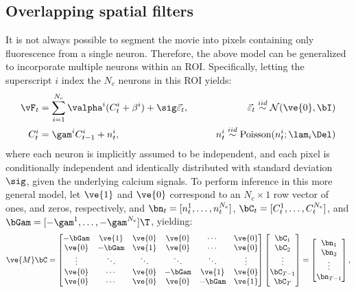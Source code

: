 \subsection{Overlapping spatial filters} \label{sec:methods:overlapping}

It is not always possible to segment the movie into pixels containing only fluorescence from a single neuron.  Therefore, the above model can be generalized to incorporate multiple neurons within an ROI.   Specifically, letting the superscript $i$ index the $N_c$ neurons in this ROI yields:  
\begin{align} \label{eq:overlapping}
\vF_t &= \sum_{i=1}^{N_c}\valpha^i (C^i_t + \beta^i) +  \sig\vec{\varepsilon}_t, \qquad &\vec{\varepsilon}_t \overset{iid}{\sim} \mathcal{N}(\ve{0},\bI)   \\
C^i_t &= \gam^i C^i_{t-1} + n^i_t, & n^i_t \overset{iid}{\sim} \text{Poisson}(n^i_t; \lam_i \Del)
\end{align}
\noindent where each neuron is implicitly assumed to be independent, and each pixel is conditionally independent and identically distributed with standard deviation $\sig$, given the underlying calcium signals.  To perform inference in this more general model, let $\ve{1}$ and $\ve{0}$ correspond to an $N_c \times 1$ row vector of ones, and zeros, respectively, and $\bn_t=[n^1_t, \ldots, n^{N_c}_t]$, $\bC_t=[C^1_t, \ldots, C^{N_c}_t]$, and $\bGam=[-\gam^1, \ldots, -\gam^{N_c}]\T$, yielding:
\begin{align} \label{eq:M2}
\ve{M} \bC = %
\begin{bmatrix}
-\bGam & \ve{1} & \ve{0} & \ve{0} & \cdots & \ve{0} \\
\ve{0} & -\bGam & \ve{1} & \ve{0} & \cdots  & \ve{0} \\
\vdots & \ddots & \ddots & \ddots & \ddots & \vdots  \\
\ve{0} & \cdots & \ve{0}  & -\bGam & \ve{1} & \ve{0} \\
\ve{0} & \cdots & \ve{0} & \ve{0} & -\bGam & \ve{1}
\end{bmatrix}
\begin{bmatrix}
\bC_1 \\ \bC_2  \\  \vdots \\ \bC_{T-1} \\ \bC_T  
\end{bmatrix}
= 
\begin{bmatrix}
\bn_1 \\ \bn_2 \\ \vdots \\ \bn_{T-1}
\end{bmatrix}
,%
\end{align}
